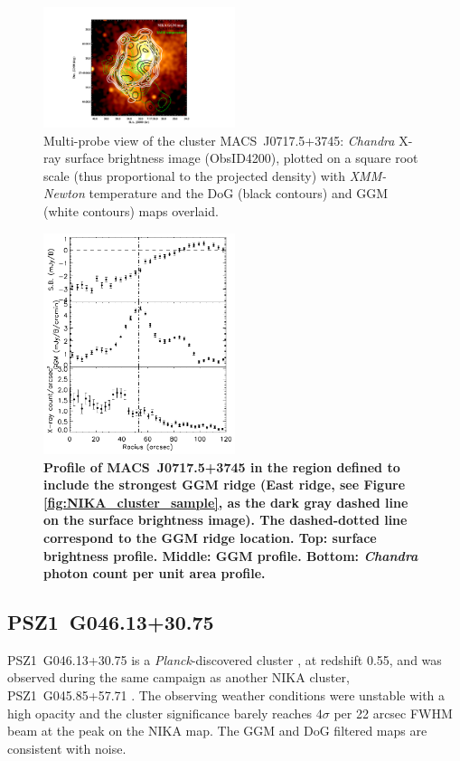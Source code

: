 \documentclass[twocolumn,traditabstract]{aa}
\begin{document}
\begin{figure}[h]
\center
\includegraphics[trim=5cm 0cm 8cm 2cm, clip=true, width=0.5\textwidth]{Figure/MACSJ0717_multiL.pdf} 
\caption{\footnotesize{Multi-probe view of the cluster \mbox{MACS~J0717.5+3745}: \textit{Chandra} X-ray surface brightness image (ObsID4200), plotted on a square root scale (thus proportional to the projected density) with \textit{XMM-Newton} temperature \citep[red contours from][]{Adam2017} and the DoG (black contours) and GGM (white contours) maps overlaid.}}
\label{fig:MACSJ0717_multiL}
\end{figure}

\begin{figure}[h]
\center
\includegraphics[trim=0cm 0cm 0cm 0cm, clip=true, width=0.5\textwidth]{Figure/profile_MACSJ0717.pdf} 
\caption{\footnotesize{\bf Profile of \mbox{MACS~J0717.5+3745} in the region defined to include the strongest GGM ridge (East ridge, see Figure \ref{fig:NIKA_cluster_sample}, as the dark gray dashed line on the surface brightness image). The dashed-dotted line correspond to the GGM ridge location. {\bf Top:} surface brightness profile. {\bf Middle:} GGM profile. {\bf Bottom:} \textit{Chandra} photon count per unit area profile.}}
\label{fig:profile_MACSJ0717}
\end{figure}


\subsection{PSZ1~G046.13+30.75}
\mbox{PSZ1~G046.13+30.75} is a \textit{Planck}-discovered cluster \citep{PlanckXXIX2014}, at redshift 0.55, and was observed during the same campaign as another NIKA cluster, \mbox{PSZ1~G045.85+57.71} \citep[see][for more details]{Ruppin2016}. The observing weather conditions were unstable with a high opacity and the cluster significance barely reaches $4 \sigma$ per 22 arcsec FWHM beam at the peak on the NIKA map. The GGM and DoG filtered maps are consistent with noise.
\end{document}
